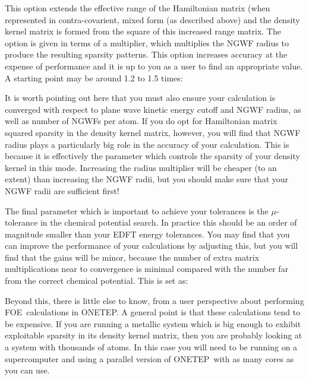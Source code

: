 \documentclass[letterpaper,10pt,english]{sphinxmanual}
\begin{document}
This option extends the effective range of the Hamiltonian matrix (when
represented in contra-covarient, mixed form (as described above) and the
density kernel matrix is formed from the square of this increased range
matrix. The option is given in terms of a multiplier, which multiplies
the NGWF radius to produce the resulting sparsity patterns. This option
increases accuracy at the expense of performance and it is up to you as
a user to find an appropriate value. A starting point may be around 1.2
to 1.5 times:

%
\begin{sphinxVerbatim}[commandchars=\\\{\}]
  
\end{sphinxVerbatim}

It is worth pointing out here that you must also ensure your calculation
is converged with respect to plane wave kinetic energy cutoff and NGWF
radius, as well as number of NGWFs per atom. If you do opt for
Hamiltonian matrix squared sparsity in the density kernel matrix,
however, you will find that NGWF radius plays a particularly big role in
the accuracy of your calculation. This is because it is effectively the
parameter which controls the sparsity of your density kernel in this
mode. Increasing the radius multiplier will be cheaper (to an extent)
than increasing the NGWF radii, but you should make sure that your NGWF
radii are sufficient first!

The final parameter which is important to achieve your tolerances is the
\(\mu\)-tolerance in the chemical potential search. In practice this
should be  an order of magnitude smaller than your EDFT energy
tolerances. You may find that you can improve the performance of your
calculations by adjusting this, but you will find that the gains will be
minor, because the number of extra matrix multiplications near to
convergence is minimal compared with the number far from the correct
chemical potential. This is set as:

%
\begin{sphinxVerbatim}[commandchars=\\\{\}]
   
\end{sphinxVerbatim}

Beyond this, there is little else to know, from a user perspective about
performing FOE calculations in ONETEP. A general point is that these
calculations tend to be expensive. If you are running a metallic system
which is big enough to exhibit exploitable sparsity in its density
kernel matrix, then you are probably looking at a system with thousands
of atoms. In this case you will need to be running on a supercomputer
and using a parallel version of ONETEP with as many cores as you can
use.
\end{document}
